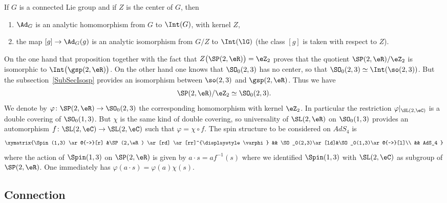 \begin{proposition}
	If $G$ is a connected Lie group and if $Z$ is the center of $G$, then
	\begin{enumerate}
		\item $\Ad_G$ is an analytic homomorphism from $G$ to $\Int(G)$, with kernel $Z$,
		\item the map $[g]\to\Ad_G(g)$ is an analytic isomorphism from $G/Z$ to $\Int(\lG)$ (the class $[g]$ is taken with respect to $Z$).
	\end{enumerate}
\end{proposition}
On the one hand that proposition together with the fact that $Z\big( \SP(2,\eR) \big)=\eZ_2$ proves that the quotient $\SP(2,\eR)/\eZ_2$ is isomorphic to $\Int\big(\gsp(2,\eR)\big)$. On the other hand one knows that $\SO_0(2,3)$ has no center, so that $\SO_0(2,3)\simeq\Int(\so(2,3))$. But the subsection~\ref{SubSecIsosp} provides an isomorphism between $\so(2,3)$ and $\gsp(2,\eR)$. Thus we have
\begin{equation}
	\SP(2,\eR)/\eZ_2\simeq \SO_0(2,3).
\end{equation}
We denote by $\varphi\colon \SP(2,\eR)\to \SO_0(2,3)$ the corresponding homomorphism with kernel $\eZ_2$. In particular the restriction $\varphi|_{\SL(2,\eC)}$ is a double covering of $\SO_0(1,3)$. But $\chi$ is the same kind of double covering, so universality of $\SL(2,\eR)$ on $\SO_0(1,3)$ provides an automorphism $f\colon \SL(2,\eC)\to \SL(2,\eC)$ such that $\varphi=\chi\circ f$. The spin structure to be considered on $AdS_4$ is
\[
	\xymatrix{%
		\Spin(1,3) \ar@{~>}[r]       &\SP(2,\eR)  \ar[rd] \ar[rr]^{\displaystyle\varphi} &&  \SO_0(2,3)\ar[ld]&\SO_0(1,3)\ar@{~>}[l]\\
		&&   AdS_4
	}
\]
where the action of $\Spin(1,3)$ on $\SP(2,\eR)$ is given by $a\cdot s=af^{-1}(s)$ where we identified $\Spin(1,3)$ with $\SL(2,\eC)$ as subgroup of $\SP(2,\eR)$. One immediately has $\varphi(a\cdot s)=\varphi(a)\chi(s)$.


\subsection{Connection}

